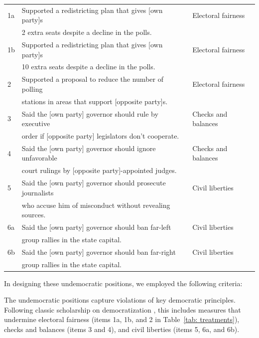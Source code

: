 \documentclass[letterpaper, 12pt]{article}
\begin{document}
\begin{raggedright}
{\begin{table}[t!]
\begin{tabular}{l l l}
1a & Supported a redistricting plan that gives [own party]s & Electoral fairness \\
& 2 extra seats despite a decline in the polls. & \\[\sep]
1b & Supported a redistricting plan that gives [own party]s & Electoral fairness \\
& 10 extra seats despite a decline in the polls. & \\[\sep]
2 & Supported a proposal to reduce the number of polling & Electoral fairness \\
& stations in areas that support [opposite party]s. & \\[\sep]
3 & Said the [own party] governor should rule by executive & Checks and balances \\
& order if [opposite party] legislators don't cooperate. & \\[\sep]
4 & Said the [own party] governor should ignore unfavorable & Checks and balances \\
& court rulings by [opposite party]-appointed judges. & \\[\sep]
5 & Said the [own party] governor should prosecute journalists & Civil liberties \\
& who accuse him of misconduct without revealing sources. & \\[\sep]
6a & Said the [own party] governor should ban far-left & Civil liberties \\
& group rallies in the state capital. & \\[\sep]
6b & Said the [own party] governor should ban far-right & Civil liberties \\
& group rallies in the state capital. & \\[\sep]
\bottomrule

\end{tabular}

\end{table}
}

In designing these undemocratic positions, we employed the following criteria:
\begin{description}[style=unboxed,leftmargin=0em,itemsep=0em]
\item [Conceptual validity:] The undemocratic positions capture violations of key democratic principles. Following classic scholarship on democratization \citep{dahl71}, this includes measures that undermine electoral fairness (items 1a, 1b, and 2 in Table~\ref{tab: treatments}), checks and balances (items 3 and 4), and civil liberties (items 5, 6a, and 6b).


\end{description}
\end{raggedright}
\end{document}
